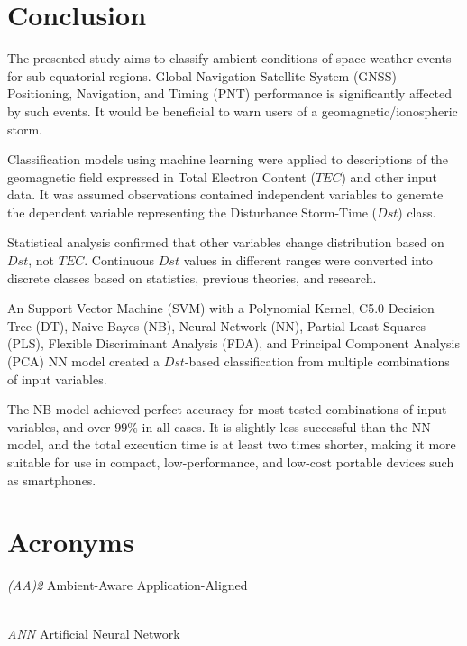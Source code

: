 \documentclass[sn-mathphys-num]{sn-jnl}%
\begin{document}
\section{Conclusion}
\label{sec:Conclusion}

The presented study aims to classify ambient conditions of space weather events for sub-equatorial regions. Global Navigation Satellite System (GNSS) Positioning, Navigation, and Timing (PNT) performance is significantly affected by such events. It would be beneficial to warn users of a geomagnetic/ionospheric storm.

Classification models using machine learning were applied to descriptions of the geomagnetic field expressed in Total Electron Content ($TEC$) and other input data. It was assumed observations contained independent variables to generate the dependent variable representing the Disturbance Storm-Time ($Dst$) class. 

Statistical analysis confirmed that other variables change distribution based on $Dst$, not $TEC$. Continuous $Dst$ values in different ranges were converted into discrete classes based on statistics, previous theories, and research. 

An Support Vector Machine (SVM) with a Polynomial Kernel, C5.0 Decision Tree (DT), Naive Bayes (NB), Neural Network (NN), Partial Least Squares (PLS), Flexible Discriminant Analysis (FDA), and Principal Component Analysis (PCA) NN model created a $Dst$-based classification from multiple combinations of input variables.

The NB model achieved perfect accuracy for most tested combinations of input variables, and over $99\%$ in all cases. It is slightly less successful than the NN model, and the total execution time is at least two times shorter, making it more suitable for use in compact, low-performance, and low-cost portable devices such as smartphones.

\clearpage

\section{Acronyms}
\label{sec:Acronyms}

\textit{(AA)2} Ambient-Aware Application-Aligned


\\[2\baselineskip]

\textit{ANN} Artificial Neural Network


\\[2\baselineskip]
\end{document}
